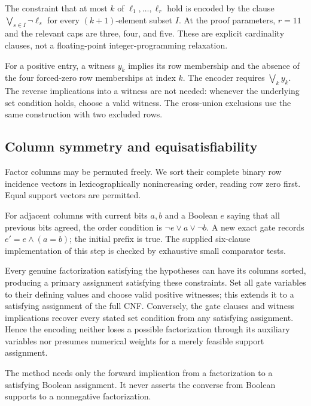 \documentclass[11pt,a4paper]{article}
\theoremstyle{definition}\newtheorem{definition}[theorem]{Definition}
\theoremstyle{remark}\newtheorem{remark}[theorem]{Remark}
\begin{document}
The constraint that at most $k$ of $\ell_1,\ldots,\ell_r$ hold is encoded
by the clause $\bigvee_{s\in I}\neg\ell_s$ for every $(k+1)$-element subset
$I$. At the proof parameters, $r=11$ and the relevant caps are three, four,
and five. These are explicit cardinality clauses, not a floating-point
integer-programming relaxation.

For a positive entry, a witness $y_k$ implies its row membership and the
absence of the four forced-zero row memberships at index $k$. The encoder
requires $\bigvee_k y_k$. The reverse implications into a witness are not
needed: whenever the underlying set condition holds, choose a valid witness.
The cross-union exclusions use the same construction with two excluded rows.

\subsection{Column symmetry and equisatisfiability}
Factor columns may be permuted freely. We sort their complete binary row
incidence vectors in lexicographically nonincreasing order, reading row zero
first. Equal support vectors are permitted.

For adjacent columns with current bits $a,b$ and a Boolean $e$ saying that
all previous bits agreed, the order condition is
$\neg e\lor a\lor\neg b$. A new exact gate records
$e'=e\wedge(a=b)$; the initial prefix is true. The supplied six-clause
implementation of this step is checked by exhaustive small comparator tests.

Every genuine factorization satisfying the hypotheses can have its columns
sorted, producing a primary assignment satisfying these constraints. Set all
gate variables to their defining values and choose valid positive witnesses;
this extends it to a satisfying assignment of the full CNF. Conversely, the
gate clauses and witness implications recover every stated set condition
from any satisfying assignment. Hence the encoding neither loses a possible
factorization through its auxiliary variables nor presumes numerical weights
for a merely feasible support assignment.

The method needs only the forward implication from a factorization to a
satisfying Boolean assignment. It never asserts the converse from Boolean
supports to a nonnegative factorization.
\end{document}
